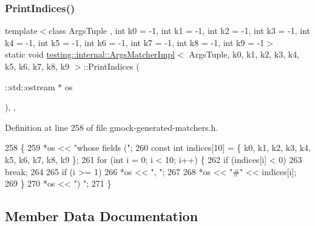 \mbox{\label{classtesting_1_1internal_1_1ArgsMatcherImpl_a2ea95d7970a1874c9616e42009ae53b0}} 
\subsubsection{\texorpdfstring{Print\+Indices()}{PrintIndices()}}
{\footnotesize\ttfamily template$<$class Args\+Tuple , int k0 = -\/1, int k1 = -\/1, int k2 = -\/1, int k3 = -\/1, int k4 = -\/1, int k5 = -\/1, int k6 = -\/1, int k7 = -\/1, int k8 = -\/1, int k9 = -\/1$>$ \\
static void \hyperlink{classtesting_1_1internal_1_1ArgsMatcherImpl}{testing\+::internal\+::\+Args\+Matcher\+Impl}$<$ Args\+Tuple, k0, k1, k2, k3, k4, k5, k6, k7, k8, k9 $>$\+::Print\+Indices (\begin{DoxyParamCaption}\item[{\+::std\+::ostream $\ast$}]{os }\end{DoxyParamCaption})\hspace{0.3cm}{\ttfamily [inline]}, {\ttfamily [static]}, {\ttfamily [private]}}



Definition at line 258 of file gmock-\/generated-\/matchers.\+h.


\begin{DoxyCode}
258                                            \{
259     *os << \textcolor{stringliteral}{"whose fields ("};
260     \textcolor{keyword}{const} \textcolor{keywordtype}{int} indices[10] = \{ k0, k1, k2, k3, k4, k5, k6, k7, k8, k9 \};
261     \textcolor{keywordflow}{for} (\textcolor{keywordtype}{int} i = 0; i < 10; i++) \{
262       \textcolor{keywordflow}{if} (indices[i] < 0)
263         \textcolor{keywordflow}{break};
264 
265       \textcolor{keywordflow}{if} (i >= 1)
266         *os << \textcolor{stringliteral}{", "};
267 
268       *os << \textcolor{stringliteral}{"#"} << indices[i];
269     \}
270     *os << \textcolor{stringliteral}{") "};
271   \}
\end{DoxyCode}


\subsection{Member Data Documentation}
\mbox{\label{classtesting_1_1internal_1_1ArgsMatcherImpl_a719ba7e85d3381661021d699c9978ed0}} 
